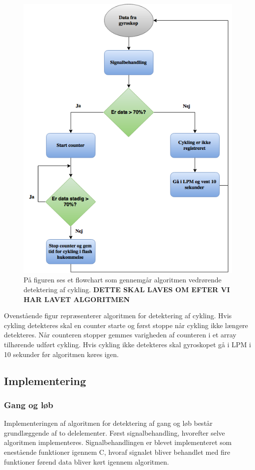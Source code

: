\begin{figure}[H]
	\centering
	\includegraphics[scale=0.6]{figures/cDesign/algoritme_cykling.png}
	\caption{På figuren ses et flowchart som gennemgår algoritmen vedrørende detektering af cykling. \textbf{DETTE SKAL LAVES OM EFTER VI HAR LAVET ALGORITMEN}}
	\label{fig:algoritme_cykling}
\end{figure}

Ovenstående figur repræsenterer algoritmen for detektering af cykling. Hvis cykling detekteres skal en counter starte og først stoppe når cykling ikke længere detekteres. Når counteren stopper gemmes varigheden af counteren i et array tilhørende udført cykling. Hvis cykling ikke detekteres skal gyroskopet gå i LPM i 10 sekunder før algoritmen køres igen. 


\subsection{Implementering}
\subsubsection{Gang og løb}
Implementeringen af algoritmen for detektering af gang og løb består grundlæggende af to delelementer. Først signalbehandling, hvorefter selve algoritmen implementeres. Signalbehandlingen er blevet implementeret som enestående funktioner igennem C, hvoraf signalet bliver behandlet med fire funktioner førend data bliver kørt igennem algoritmen.

